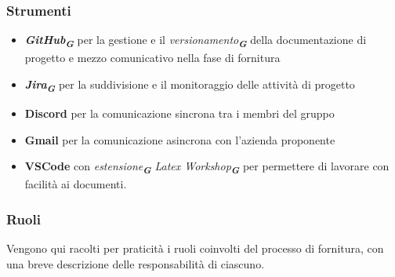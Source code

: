 \documentclass[a4paper,12pt]{article}
\newcommand{\glossario}[1]{\textit{#1}\textsubscript{\textbf{\textit{\textcolor{lightblack}{G}}}}}
\begin{document}
\subsubsection{Strumenti}
\begin{itemize}
    \item \glossario{\textbf{GitHub}} per la gestione e il \glossario{versionamento} della documentazione di progetto e mezzo comunicativo nella fase di fornitura
    \item \glossario{\textbf{Jira}} per la suddivisione e il monitoraggio delle attività di progetto
    \item \textbf{Discord} per la comunicazione sincrona tra i membri del gruppo
    \item \textbf{Gmail} per la comunicazione asincrona con l'azienda proponente
    \item \textbf{VSCode} con \glossario{estensione} \glossario{Latex Workshop} per permettere di lavorare con facilità ai documenti.
\end{itemize}

\subsubsection{Ruoli}
Vengono qui racolti per praticità i ruoli coinvolti del processo di fornitura, con una breve descrizione delle responsabilità di ciascuno.
\end{document}
